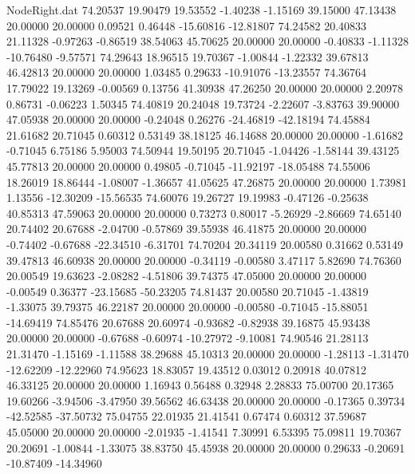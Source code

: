 \begin{filecontents}{NodeRight.dat}
  74.20537   19.90479   19.53552    -1.40238   -1.15169   39.15000   47.13438   20.00000   20.00000    0.09521    0.46448  -15.60816  -12.81807
  74.24582   20.40833   21.11328    -0.97263   -0.86519   38.54063   45.70625   20.00000   20.00000   -0.40833   -1.11328  -10.76480   -9.57571
  74.29643   18.96515   19.70367    -1.00844   -1.22332   39.67813   46.42813   20.00000   20.00000    1.03485    0.29633  -10.91076  -13.23557
  74.36764   17.79022   19.13269    -0.00569    0.13756   41.30938   47.26250   20.00000   20.00000    2.20978    0.86731   -0.06223    1.50345
  74.40819   20.24048   19.73724    -2.22607   -3.83763   39.90000   47.05938   20.00000   20.00000   -0.24048    0.26276  -24.46819  -42.18194
  74.45884   21.61682   20.71045     0.60312    0.53149   38.18125   46.14688   20.00000   20.00000   -1.61682   -0.71045    6.75186    5.95003
  74.50944   19.50195   20.71045    -1.04426   -1.58144   39.43125   45.77813   20.00000   20.00000    0.49805   -0.71045  -11.92197  -18.05488
  74.55006   18.26019   18.86444    -1.08007   -1.36657   41.05625   47.26875   20.00000   20.00000    1.73981    1.13556  -12.30209  -15.56535
  74.60076   19.26727   19.19983    -0.47126   -0.25638   40.85313   47.59063   20.00000   20.00000    0.73273    0.80017   -5.26929   -2.86669
  74.65140   20.74402   20.67688    -2.04700   -0.57869   39.55938   46.41875   20.00000   20.00000   -0.74402   -0.67688  -22.34510   -6.31701
  74.70204   20.34119   20.00580     0.31662    0.53149   39.47813   46.60938   20.00000   20.00000   -0.34119   -0.00580    3.47117    5.82690
  74.76360   20.00549   19.63623    -2.08282   -4.51806   39.74375   47.05000   20.00000   20.00000   -0.00549    0.36377  -23.15685  -50.23205
  74.81437   20.00580   20.71045    -1.43819   -1.33075   39.79375   46.22187   20.00000   20.00000   -0.00580   -0.71045  -15.88051  -14.69419
  74.85476   20.67688   20.60974    -0.93682   -0.82938   39.16875   45.93438   20.00000   20.00000   -0.67688   -0.60974  -10.27972   -9.10081
  74.90546   21.28113   21.31470    -1.15169   -1.11588   38.29688   45.10313   20.00000   20.00000   -1.28113   -1.31470  -12.62209  -12.22960
  74.95623   18.83057   19.43512     0.03012    0.20918   40.07812   46.33125   20.00000   20.00000    1.16943    0.56488    0.32948    2.28833
  75.00700   20.17365   19.60266    -3.94506   -3.47950   39.56562   46.63438   20.00000   20.00000   -0.17365    0.39734  -42.52585  -37.50732
  75.04755   22.01935   21.41541     0.67474    0.60312   37.59687   45.05000   20.00000   20.00000   -2.01935   -1.41541    7.30991    6.53395
  75.09811   19.70367   20.20691    -1.00844   -1.33075   38.83750   45.45938   20.00000   20.00000    0.29633   -0.20691  -10.87409  -14.34960

\end{filecontents}
